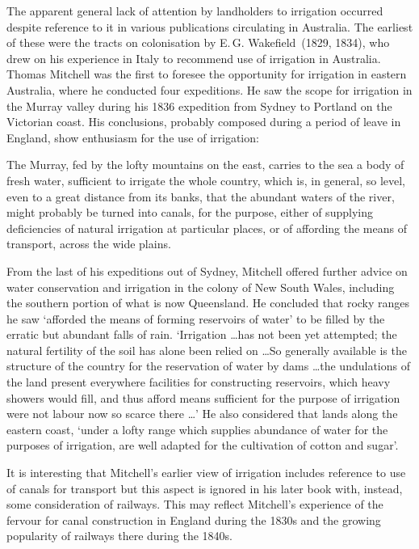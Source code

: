 The apparent general lack of attention by landholders to irrigation
occurred despite reference to it in various publications circulating
in Australia.  The earliest of these were the tracts on colonisation
by E.\,G. Wakefield~(1829, 1834),  who drew
on his experience in Italy to recommend use of irrigation in
Australia.  Thomas Mitchell  was the first to
foresee the opportunity for irrigation in eastern Australia, where he
conducted four expeditions.  He saw the scope for irrigation in the
Murray valley during his 1836 expedition from Sydney to Portland on
the Victorian coast. His conclusions, probably composed during a
period of leave in England, show enthusiasm for the use of irrigation:
\begin{Quote}
	The Murray, fed by the lofty mountains on the east, carries to
	the sea a body of fresh water, sufficient to irrigate the
	whole country, which is, in general, so level, even to a great
	distance from its banks, that the abundant waters of the
	river, might probably be turned into canals, for the purpose,
	either of supplying deficiencies of natural irrigation at
	particular places, or of affording the means of transport,
	across the wide plains.
\end{Quote}

From the last of his expeditions out of Sydney, Mitchell offered
further advice on water conservation and irrigation in the colony of
New South Wales, including the southern portion of what is now
Queensland.  He concluded that rocky ranges he saw `afforded the means
of forming reservoirs of water' to be filled by the erratic but
abundant falls of rain.  `Irrigation \ldots has not been yet attempted;
the natural fertility of the soil has alone been relied on \ldots So
generally available is the structure of the country for the
reservation of water by dams \ldots the undulations of the land present
everywhere facilities for constructing reservoirs, which heavy showers
would fill, and thus afford means sufficient for the purpose of
irrigation were not labour now so scarce there \ldots' He also
considered that lands along the eastern coast, `under a lofty range
which supplies abundance of water for the purposes of irrigation, are
well adapted for the cultivation of cotton and
sugar'.

It is interesting that Mitchell's earlier view of irrigation includes
reference to use of canals for transport but this aspect is ignored in
his later book with, instead, some consideration of railways.  This may
reflect Mitchell's experience of the fervour for canal construction in
England during the 1830s and the growing popularity of railways there
during the 1840s.

